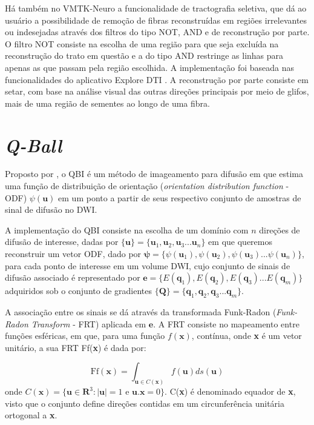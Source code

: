 \documentclass[
    12pt,                %
    oneside,            %
    a4paper,            %
    english,            %
    french,                %
    spanish,            %
    brazil                %
    ]{abntex2}
\begin{document}
Há também no VMTK-Neuro a funcionalidade de tractografia seletiva, que dá ao usuário a possibilidade de remoção de fibras reconstruídas em regiões irrelevantes ou indesejadas através dos filtros do tipo NOT, AND e de reconstrução por parte. O filtro NOT consiste na escolha de uma região para que seja excluída na reconstrução do trato em questão e a do tipo AND restringe as linhas para apenas as que passam pela região escolhida. A implementação foi  baseada nas funcionalidades do aplicativo Explore DTI \cite{exploredti2009}. A reconstrução por parte consiste em setar, com base na análise visual das outras direções principais por meio de glifos, mais de uma região de sementes ao longo de uma fibra.

\section{\textit{Q-Ball}}

Proposto por , o QBI é um método de imageamento para difusão em que estima uma função de distribuição de orientação (\textit{orientation distribution function} - ODF) $\psi(\mathbf{u})$ em um ponto a partir de seus respectivo conjunto de amostras de sinal de difusão no DWI.

A implementação do QBI consiste na escolha de um domínio com $n$ direções de difusão de interesse, dadas por $\{\textbf{u} \}= \{ \textbf{u}_1, \textbf{u}_2, \textbf{u}_3 ... \textbf{u}_n\}$ em que queremos reconstruir um vetor ODF, dado por $ \boldsymbol{\psi} = \{ \psi(\mathbf{u}_1), \psi(\mathbf{u}_2), \psi(\mathbf{u}_3) ... \psi(\mathbf{u}_n)\}$, para cada ponto de interesse em um volume DWI, cujo conjunto de sinais de difusão associado é representado por $\boldsymbol{e} = \{ E(\mathbf{q}_1), E(\mathbf{q}_2), E(\mathbf{q}_3) ... E(\mathbf{q}_m)\}$ adquiridos sob o conjunto de gradientes $\{\textbf{Q} \}= \{ \textbf{q}_1, \textbf{q}_2, \textbf{q}_3 ... \textbf{q}_m\}$. 


A associação entre os sinais se dá através da transformada Funk-Radon (\textit{Funk-Radon Transform} - FRT) aplicada em $ \boldsymbol{e}$. A FRT consiste no mapeamento entre funções esféricas, em que, para uma função $f(\mathbf{x})$, contínua, onde \textbf{x} é um vetor unitário, a sua FRT Ff(\textbf{x}) é dada por:

\begin{equation}
    \text{Ff}(\textbf{x}) = \int_{\textbf{u}\in C(\textbf{x})}f(\textbf{u})ds(\textbf{u})
\end{equation}
onde $C(\textbf{x}) = \{ \mathbf{u} \in  \mathbf{R}^3:|\mathbf{u}|=1 \text{ e } \mathbf{u}.\mathbf{x} = 0  \}$. C(\textbf{x}) é denominado equador de \textbf{x}, visto que o conjunto define direções contidas em um circunferência unitária ortogonal a \textbf{x}.
\end{document}
